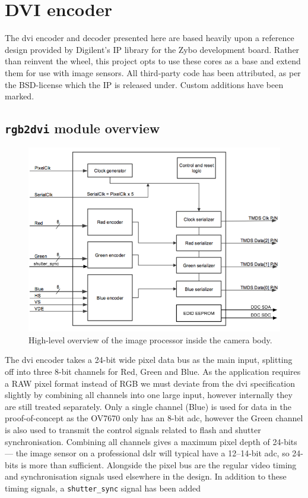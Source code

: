 \section{DVI encoder}


The \gls{dvi} encoder and decoder presented here are based heavily upon a reference design provided by Digilent's IP library for the Zybo development board. Rather than reinvent the wheel, this project opts to use these cores as a base and extend them for use with image sensors. All third-party code has been attributed, as per the BSD-license which the IP is released under. Custom additions have been marked.

\subsection{\texttt{rgb2dvi} module overview}
\begin{figure}
  \centering
  \includegraphics[width=1\textwidth]{./img/rgb2dvi.png}
  \caption{High-level overview of the image processor inside the camera body.}
  \label{fig:image_processor_diagram}
\end{figure}

The \gls{dvi} encoder takes a 24-bit wide pixel data bus as the main input, splitting off into three 8-bit channels for Red, Green and Blue. As the application requires a RAW pixel format instead of RGB we must deviate from the \gls{dvi} specification slightly by combining all channels into one large input, however internally they are still treated separately. Only a single channel (Blue) is used for data in the proof-of-concept as the OV7670 only has an 8-bit \gls{adc}, however the Green channel is also used to transmit the control signals related to flash and shutter synchronisation. Combining all channels gives a maximum pixel depth of 24-bits --- the image sensor on a professional \gls{dslr} will typical have a 12--14-bit \gls{adc}, so 24-bits is more than sufficient. Alongside the pixel bus are the regular video timing and synchronisation signals used elsewhere in the design. In addition to these timing signals, a \texttt{shutter\_sync} signal has been added 

